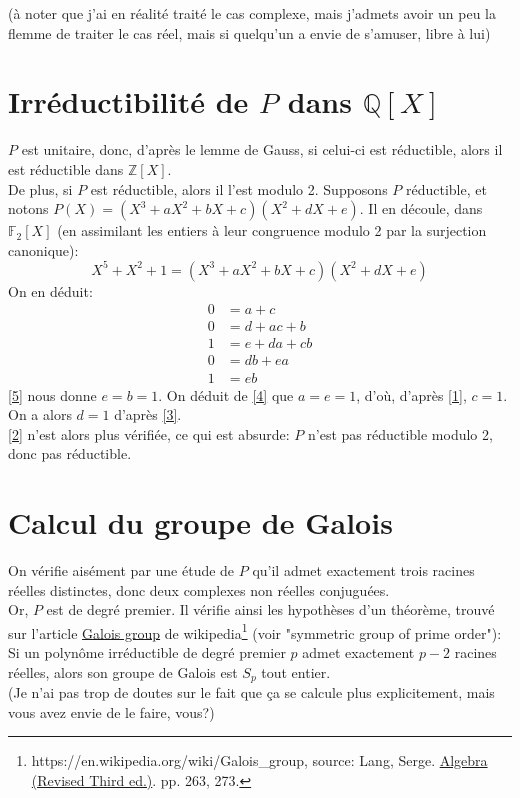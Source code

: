 \documentclass[a4paper, 12pt]{article}
\begin{document}
	(à noter que j'ai en réalité traité le cas complexe, mais j'admets avoir un peu la flemme de traiter le cas réel, mais si quelqu'un a envie de s'amuser, libre à lui)

	\section{Irréductibilité de $P$ dans $\mathbb Q [X]$}
	$P$ est unitaire, donc, d'après le lemme de Gauss\footnotemark, si celui-ci est réductible, alors il est réductible dans $\mathbb Z [X]$.\\
	De plus, si $P$ est réductible, alors il l'est modulo 2. Supposons $P$ réductible, et notons $P(X) = (X^3 + a X^2 + bX + c) (X^2+ dX + e)$. Il en découle, dans $\mathbb F_2[X]$ (en assimilant les entiers à leur congruence modulo 2 par la surjection canonique):
	$$ X^5 + X^2 + 1 = (X^3 + a X^2 + bX + c) (X^2+ dX + e)$$
	On en déduit:
	\begin{align}
		0 & = a+c  \label{1} \\
		0 & = d + ac + b  \label{2} \\
		1 & = e + da + cb  \label{3} \\
		0 & = db + ea \label{4} \\
		1 & = eb  \label{5}
	\end{align}
	\eqref{5} nous donne $e=b=1$. On déduit de \eqref{4} que $a=e=1$, d'où, d'après \eqref{1}, $c=1$. On a alors $d=1$ d'après \eqref{3}. \\
	\eqref{2} n'est alors plus vérifiée, ce qui est absurde: $P$ n'est pas réductible modulo 2, donc pas réductible. \\

	
	\section{Calcul du groupe de Galois}
	On vérifie aisément par une étude de $P$ qu'il admet exactement trois racines réelles distinctes, donc deux complexes non réelles conjuguées. \\
	Or, $P$ est de degré premier. Il vérifie ainsi les hypothèses d'un théorème, trouvé sur l'article \underline{Galois group} de wikipedia\footnote{https://en.wikipedia.org/wiki/Galois\_group, source: Lang, Serge. \underline{Algebra (Revised Third ed.)}. pp. 263, 273.} (voir "symmetric group of prime order"): Si un polynôme irréductible de degré premier $p$ admet exactement $p-2$ racines réelles, alors son groupe de Galois est $S_p$ tout entier.  \\
	(Je n'ai pas trop de doutes sur le fait que ça se calcule plus explicitement, mais vous avez envie de le faire, vous?)
	
\end{document}
